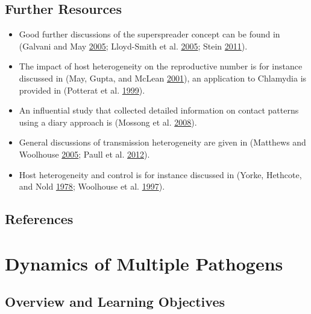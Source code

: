 \documentclass[
]{book}
\providecommand{\tightlist}{%
  \setlength{\itemsep}{0pt}\setlength{\parskip}{0pt}}
\begin{document}
\hypertarget{further-resources-10}{%
\section{Further Resources}\label{further-resources-10}}

\begin{itemize}
\tightlist
\item
  Good further discussions of the superspreader concept can be found in (Galvani and May \protect\hyperlink{ref-galvani05}{2005}; Lloyd-Smith et al. \protect\hyperlink{ref-lloyd-smith05}{2005}; Stein \protect\hyperlink{ref-stein11}{2011}).
\item
  The impact of host heterogeneity on the reproductive number is for instance discussed in (May, Gupta, and McLean \protect\hyperlink{ref-may01}{2001}), an application to Chlamydia is provided in (Potterat et al. \protect\hyperlink{ref-potterat99}{1999}).
\item
  An influential study that collected detailed information on contact patterns using a diary approach is (Mossong et al. \protect\hyperlink{ref-mossong08}{2008}).
\item
  General discussions of transmission heterogeneity are given in (Matthews and Woolhouse \protect\hyperlink{ref-matthews05}{2005}; Paull et al. \protect\hyperlink{ref-paull12}{2012}).
\item
  Host heterogeneity and control is for instance discussed in (Yorke, Hethcote, and Nold \protect\hyperlink{ref-yorke78}{1978}; Woolhouse et al. \protect\hyperlink{ref-woolhouse97}{1997}).
\end{itemize}

\hypertarget{references-11}{%
\section{References}\label{references-11}}

\hypertarget{dynamics-of-multiple-pathogens}{%
\chapter{Dynamics of Multiple Pathogens}\label{dynamics-of-multiple-pathogens}}

\hypertarget{overview-and-learning-objectives-11}{%
\section{Overview and Learning Objectives}\label{overview-and-learning-objectives-11}}
\end{document}
